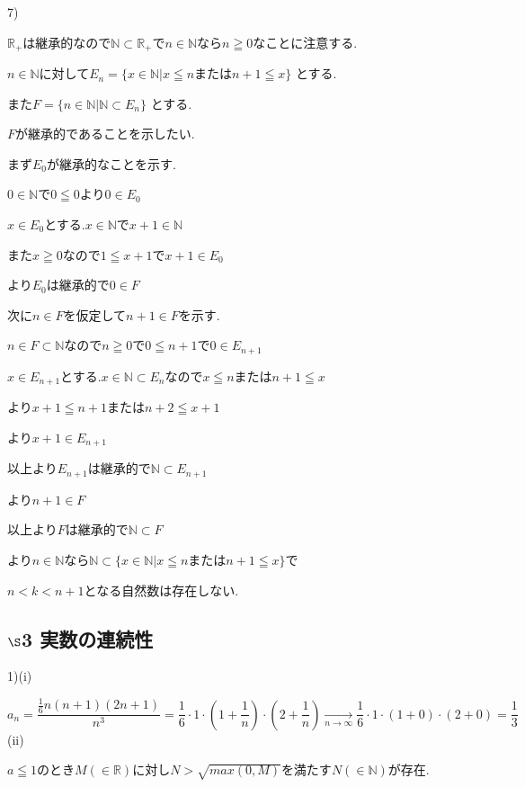 \documentclass{jsarticle}
\begin{document}
       7)
       
       $\mathbb{R}_+$は継承的なので$\mathbb{N}\subset \mathbb{R}_+$で$n\in \mathbb{N}$なら$n\geqq 0$なことに注意する.
       
       $n\in \mathbb{N}$に対して$E_n=\{x\in \mathbb{N}|x\leqq nまたは n+1\leqq x\}$
       とする.
       
       また$F=\{n\in \mathbb{N}|\mathbb{N}\subset E_n\}$
       とする.
       
       $F$が継承的であることを示したい.
       
       まず$E_0$が継承的なことを示す.
       
       $0\in \mathbb{N}$で$0\leqq 0$より$0\in E_0$
       
       $x\in E_0$とする.$x\in \mathbb{N}$で$x+1\in\mathbb{N}$
       
       また$x\geqq 0$なので$1\leqq x+1$で$x+1\in E_0$
       
       より$E_0$は継承的で$0\in F$
       
       次に$n\in F$を仮定して$n+1\in F$を示す.
       
       $n\in F \subset \mathbb{N}$なので$n\geqq 0$で$0\leqq n+1$で$0\in E_{n+1}$
       
       $x\in E_{n+1}$とする.$x \in \mathbb{N} \subset E_n$なので$x\leqq n $または$n+1\leqq x$
       
       より$x+1\leqq n+1$または$n+2\leqq x+1$
       
       より$x+1\in E_{n+1}$
       
       以上より$E_{n+1}$は継承的で$\mathbb{N}\subset E_{n+1}$
       
       より$n+1\in F$
       
       以上より$F$は継承的で$\mathbb{N}\subset F$
       
       より$n\in \mathbb{N}$なら$\mathbb{N}\subset \{x\in \mathbb{N}|x\leqq nまたは n+1\leqq x\}$で
       
       $n<k<n+1$となる自然数は存在しない.
       \subsection*{$\S$3 実数の連続性}
       1)(i)
       
       \[a_n=\frac{\frac{1}{6}n(n+1)(2n+1)}{n^3}=\frac{1}{6}\cdot 1\cdot (1+\frac{1}{n})\cdot (2+\frac{1}{n})\xrightarrow[n\to \infty]{} \frac{1}{6}\cdot 1\cdot (1+0)\cdot (2+0)=\frac{1}{3}\]
       (ii)
       
       $a\leqq 1$のとき$M(\in\mathbb{R})$に対し$N>\sqrt{max(0,M)}$を満たす$N(\in \mathbb{N})$が存在.
       
\end{document}
